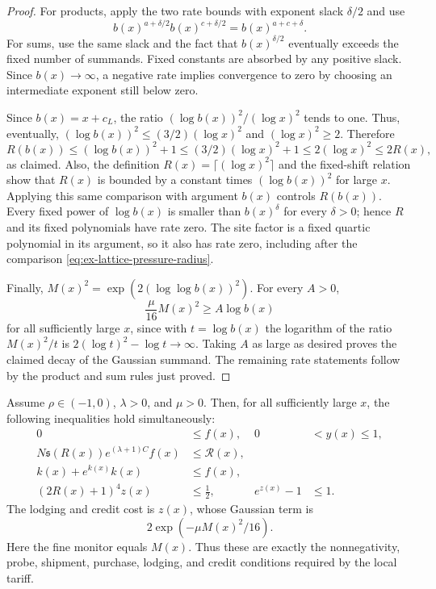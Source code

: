 \begin{proof}
For products, apply the two rate bounds with exponent slack $\delta/2$ and
use
\[b(x)^{a+\delta/2}b(x)^{c+\delta/2}=b(x)^{a+c+\delta}.\]
For sums,
use the same slack and the fact that $b(x)^{\delta/2}$ eventually exceeds
the fixed number of summands. Fixed constants are absorbed by any positive
slack. Since $b(x)\to\infty$, a negative rate implies convergence to zero by
choosing an intermediate exponent still below zero.

Since $b(x)=x+c_L$, the ratio $(\log b(x))^2/(\log x)^2$ tends to one.
Thus, eventually, $(\log b(x))^2\leq(3/2)(\log x)^2$ and
$(\log x)^2\geq2$. Therefore
\[
 R(b(x))\leq(\log b(x))^2+1
 \leq(3/2)(\log x)^2+1
 \leq2(\log x)^2\leq2R(x),
\]
as claimed. Also, the definition $R(x)=\lceil(\log x)^2\rceil$ and the
fixed-shift relation show that $R(x)$ is bounded by a constant times
$(\log b(x))^2$ for large $x$. Applying this same comparison with argument
$b(x)$ controls $R(b(x))$. Every fixed power of
$\log b(x)$ is smaller than $b(x)^\delta$ for every $\delta>0$; hence $R$
and its fixed polynomials have rate zero. The site factor is a fixed
quartic polynomial in its argument, so it also has rate zero, including
after the comparison \eqref{eq:ex-lattice-pressure-radius}.

Finally, $M(x)^2=\exp(2(\log\log b(x))^2)$. For every $A>0$,
\[
 \frac{\mu}{16}M(x)^2\geq A\log b(x)
\]
for all sufficiently large $x$, since with $t=\log b(x)$ the logarithm of
the ratio $M(x)^2/t$ is $2(\log t)^2-\log t\to\infty$. Taking $A$ as
large as desired proves the claimed decay of the Gaussian summand. The
remaining rate statements follow by the product and sum rules just proved.
\end{proof}

\begin{proposition}
\label{prop:ex-lattice-eventual-tariff}
Assume $\rho\in(-1,0)$, $\lambda>0$, and $\mu>0$. Then, for all
sufficiently large $x$, the following inequalities hold simultaneously:
\begin{align}
 0&\leq f(x), & 0&<y(x)\leq1, \label{eq:ex-lattice-price-basic}\\
 N\mathfrak s(R(x))e^{(\lambda+1)C}f(x)
   &\leq \mathcal R(x), \label{eq:ex-lattice-price-shipping}\\
 k(x)+e^{k(x)}k(x)&\leq f(x), \label{eq:ex-lattice-price-buy}\\
 (2R(x)+1)^4z(x)&\leq\tfrac12,
 &e^{z(x)}-1&\leq1.
 \label{eq:ex-lattice-price-lodging}
\end{align}
The lodging and credit cost is $z(x)$, whose Gaussian term is
\[2\exp(-\mu M(x)^2/16).\]
Here the fine monitor equals $M(x)$. Thus these are exactly the nonnegativity, probe, shipment, purchase,
lodging, and credit conditions required by the local tariff.
\end{proposition}

